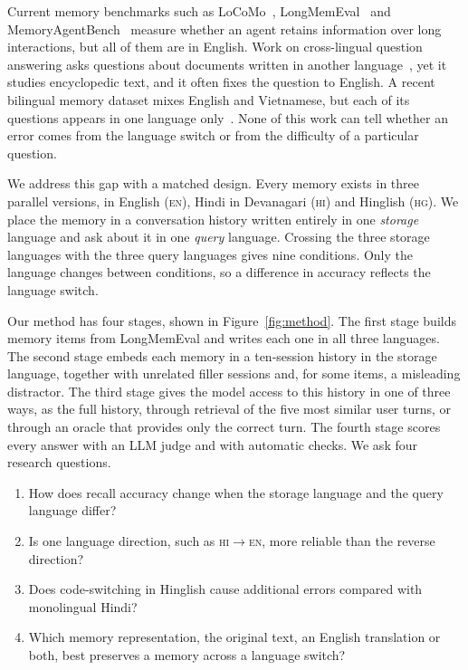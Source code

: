 \documentclass[11pt]{article}
\newcommand{\EN}{\textsc{en}}
\newcommand{\HI}{\textsc{hi}}
\newcommand{\HG}{\textsc{hg}}
\begin{document}
Current memory benchmarks such as LoCoMo~\citep{maharana2024locomo}, LongMemEval~\citep{wu2025longmemeval} and MemoryAgentBench~\citep{hu2026memoryagentbench} measure whether an agent retains information over long interactions, but all of them are in English.
Work on cross-lingual question answering asks questions about documents written in another language~\citep{lewis2020mlqa,hengle2025mlneedle}, yet it studies encyclopedic text, and it often fixes the question to English.
A recent bilingual memory dataset mixes English and Vietnamese, but each of its questions appears in one language only~\citep{nguyendang2026lhmemory}.
None of this work can tell whether an error comes from the language switch or from the difficulty of a particular question.

We address this gap with a matched design.
Every memory exists in three parallel versions, in English (\EN), Hindi in Devanagari (\HI) and Hinglish (\HG).
We place the memory in a conversation history written entirely in one \emph{storage} language and ask about it in one \emph{query} language.
Crossing the three storage languages with the three query languages gives nine conditions.
Only the language changes between conditions, so a difference in accuracy reflects the language switch.

Our method has four stages, shown in Figure~\ref{fig:method}.
The first stage builds memory items from LongMemEval and writes each one in all three languages.
The second stage embeds each memory in a ten-session history in the storage language, together with unrelated filler sessions and, for some items, a misleading distractor.
The third stage gives the model access to this history in one of three ways, as the full history, through retrieval of the five most similar user turns, or through an oracle that provides only the correct turn.
The fourth stage scores every answer with an LLM judge and with automatic checks.
We ask four research questions.
\begin{enumerate}[label=\textbf{RQ\arabic*},leftmargin=*,itemsep=1pt,topsep=2pt]
  \item How does recall accuracy change when the storage language and the query language differ?
  \item Is one language direction, such as \HI$\rightarrow$\EN, more reliable than the reverse direction?
  \item Does code-switching in Hinglish cause additional errors compared with monolingual Hindi?
  \item Which memory representation, the original text, an English translation or both, best preserves a memory across a language switch?
\end{enumerate}
\end{document}
